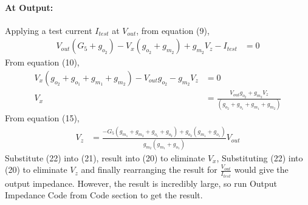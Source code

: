 \begin{enumerate}
    \paragraph{At Output:} Applying a test current $I_{test}$
      at $V_{out}$, from equation (9),
      \begin{align*}
        V_{out}(G_5 + g_{o_2}) - V_{x}(g_{o_2} + g_{m_2}) + g_{m_2}V_{z} - I_{test} &= 0 \tag{20}
      \end{align*}
      From equation (10),
      \begin{align*}
        V_{x}(g_{o_2} + g_{o_1} + g_{m_1} + g_{m_2}) - V_{out}g_{o_2} - g_{m_2}V_{z} &= 0 \\
        V_{x} &= \frac{V_{out}g_{o_2} + g_{m_2}V_{z}}{(g_{o_2} + g_{o_1} + g_{m_1} + g_{m_2})} \tag{21}
      \end{align*}
      From equation (15),
      \begin{align*}
        V_{z} &= \frac{-G_5(g_{m_1} + g_{m_2} + g_{o_1} + g_{o_2}) + g_{o_2}(g_{m_1} + g_{o_1})}{g_{m_2}(g_{m_1} + g_{o_1})} V_{out} \tag{22}
      \end{align*}
      Substitute (22) into (21), result into (20) to eliminate
      $V_{x}$, Substituting (22) into (20) to eliminate $V_{z}$
      and finally rearranging the result for $\frac{V_{out}}{I_{test}}$
      would give the output impedance. However, the result
      is incredibly large, so run Output Impedance Code from
      Code section to get the result.
\end{enumerate}

